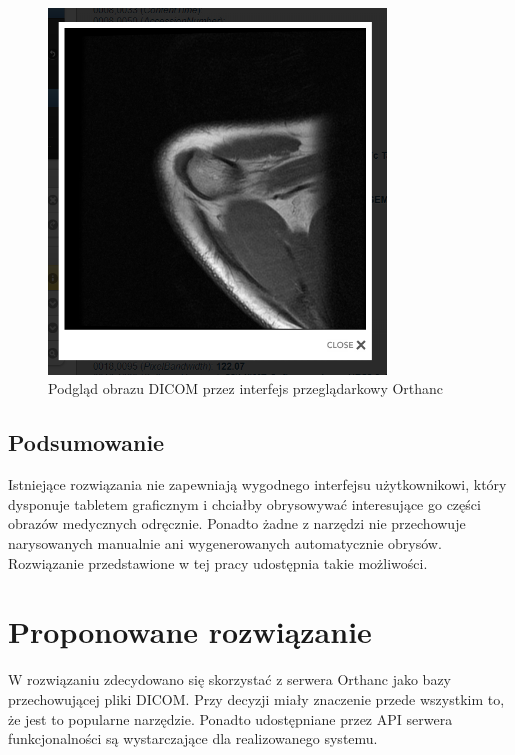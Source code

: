 \documentclass[a4paper,11pt,twoside,openright]{report}
\theoremstyle{definition}
\begin{document}
\begin{figure}[h]
	\center
	\includegraphics[width=0.8\textwidth]{Orthanc-preview}
	\caption{Podgląd obrazu DICOM przez interfejs przeglądarkowy Orthanc}
    	\label{fig:Orthanc-preview}
\end{figure}

\subsection {Podsumowanie}

Istniejące rozwiązania nie zapewniają wygodnego interfejsu użytkownikowi, który dysponuje tabletem graficznym i chciałby obrysowywać interesujące go części obrazów medycznych odręcznie. Ponadto żadne z narzędzi nie przechowuje narysowanych manualnie ani wygenerowanych automatycznie obrysów.  Rozwiązanie przedstawione w tej pracy udostępnia takie możliwości.


\section {Proponowane rozwiązanie}

W rozwiązaniu zdecydowano się skorzystać z serwera Orthanc jako bazy przechowującej pliki DICOM. Przy decyzji miały znaczenie przede wszystkim to, że jest to popularne narzędzie. Ponadto udostępniane przez API serwera funkcjonalności są wystarczające dla realizowanego systemu.
\end{document}
